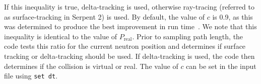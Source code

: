 If this inequality is true, delta-tracking is used, otherwise
ray-tracing (referred to as surface-tracking in Serpent 2) is used. By
default, the value of $c$ is 0.9, as this was determined to produce
the best improvement in run time~\cite{leppanen2010}. We note that
this inequality is identical to the value of $P_\mathrm{real}$. Prior to
sampling path length, the code tests this ratio for the current
neutron position and determines if surface tracking or delta-tracking
should be used. If delta-tracking is used, the code then determines if
the collision is virtual or real. The value of $c$ can be set in the
input file using \verb|set dt|.


%

